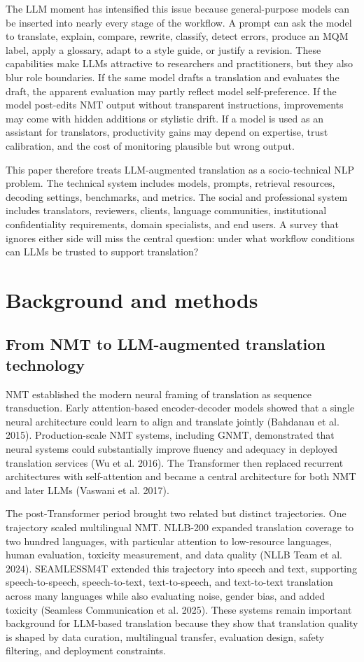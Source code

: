 \documentclass[11pt]{article}
\begin{document}
The LLM moment has intensified this issue because general-purpose models can be inserted into nearly every stage of the workflow. A prompt can ask the model to translate, explain, compare, rewrite, classify, detect errors, produce an MQM label, apply a glossary, adapt to a style guide, or justify a revision. These capabilities make LLMs attractive to researchers and practitioners, but they also blur role boundaries. If the same model drafts a translation and evaluates the draft, the apparent evaluation may partly reflect model self-preference. If the model post-edits NMT output without transparent instructions, improvements may come with hidden additions or stylistic drift. If a model is used as an assistant for translators, productivity gains may depend on expertise, trust calibration, and the cost of monitoring plausible but wrong output.

This paper therefore treats LLM-augmented translation as a socio-technical NLP problem. The technical system includes models, prompts, retrieval resources, decoding settings, benchmarks, and metrics. The social and professional system includes translators, reviewers, clients, language communities, institutional confidentiality requirements, domain specialists, and end users. A survey that ignores either side will miss the central question: under what workflow conditions can LLMs be trusted to support translation?


\section{Background and methods}
\subsection{From NMT to LLM-augmented translation technology}
NMT established the modern neural framing of translation as sequence transduction. Early attention-based encoder-decoder models showed that a single neural architecture could learn to align and translate jointly (Bahdanau et al. 2015). Production-scale NMT systems, including GNMT, demonstrated that neural systems could substantially improve fluency and adequacy in deployed translation services (Wu et al. 2016). The Transformer then replaced recurrent architectures with self-attention and became a central architecture for both NMT and later LLMs (Vaswani et al. 2017).

The post-Transformer period brought two related but distinct trajectories. One trajectory scaled multilingual NMT. NLLB-200 expanded translation coverage to two hundred languages, with particular attention to low-resource languages, human evaluation, toxicity measurement, and data quality (NLLB Team et al. 2024). SEAMLESSM4T extended this trajectory into speech and text, supporting speech-to-speech, speech-to-text, text-to-speech, and text-to-text translation across many languages while also evaluating noise, gender bias, and added toxicity (Seamless Communication et al. 2025). These systems remain important background for LLM-based translation because they show that translation quality is shaped by data curation, multilingual transfer, evaluation design, safety filtering, and deployment constraints.
\end{document}
